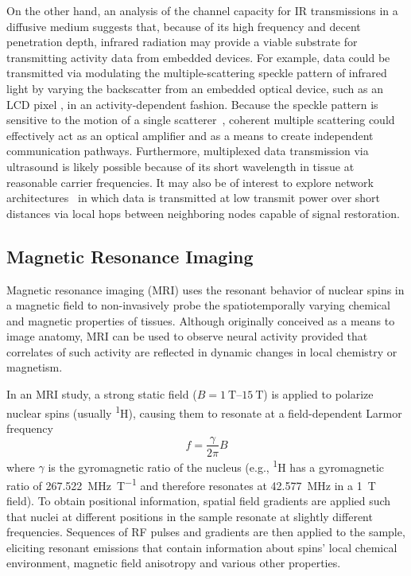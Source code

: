 On the other hand, an analysis of the channel capacity for IR transmissions in a diffusive medium suggests that, because of its high frequency and decent penetration depth, infrared radiation may provide a viable substrate for transmitting activity data from embedded devices.
For example, data could be transmitted via modulating the multiple-scattering speckle pattern of infrared light by varying the backscatter from an embedded optical device, such as an LCD pixel \cite{komanduri2008reflective}, in an activity-dependent fashion.
Because the speckle pattern is sensitive to the motion of a single scatterer~\cite{berkovits91, pappu2002physical}, coherent multiple scattering could effectively act as an optical amplifier and as a means to create independent communication pathways. Furthermore, multiplexed data transmission via ultrasound is likely possible because of its short wavelength in tissue at reasonable carrier frequencies.
It may also be of interest to explore network architectures~\cite{Bush2011} in which data is transmitted at low transmit power over short distances via local hops between neighboring nodes capable of signal restoration.

\subsection{Magnetic Resonance Imaging}

Magnetic resonance imaging (MRI) uses the resonant behavior of nuclear spins in a magnetic field to non-invasively probe the spatiotemporally varying chemical and magnetic properties of tissues.
Although originally conceived as a means to image anatomy, MRI can be used to observe neural activity provided that correlates of such activity are reflected in dynamic changes in local chemistry or magnetism.

In an MRI study, a strong static field ($B = \SIrange{1}{15}{\tesla}$) is applied to polarize nuclear spins (usually \textsuperscript{1}H), causing them to resonate at a field-dependent Larmor frequency \[f = \frac{\gamma}{2\pi} B\] where $\gamma$ is the gyromagnetic ratio of the nucleus (e.g., \textsuperscript{1}H has a gyromagnetic ratio of \SI{267.522}{\mega\hertz\per\tesla} \cite{codata10} and therefore resonates at \SI{42.577}{\mega\hertz} in a \SI{1}{\tesla} field).
To obtain positional information, spatial field gradients are applied such that nuclei at different positions in the sample resonate at slightly different frequencies.
Sequences of RF pulses and gradients are then applied to the sample, eliciting resonant emissions that contain information about spins' local chemical environment, magnetic field anisotropy and various other properties.

